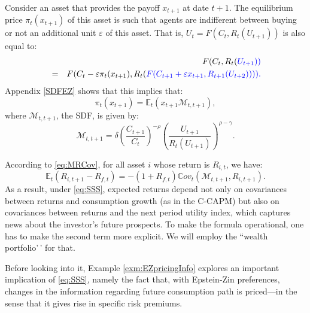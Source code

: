 \documentclass[
  12pt,
]{book}
\theoremstyle{definition}
\theoremstyle{definition}
\theoremstyle{definition}
\theoremstyle{definition}
\theoremstyle{remark}
\begin{document}
Consider an asset that provides the payoff \(x_{t+1}\) at date \(t+1\).
The equilibrium price \(\pi_t(x_{t+1})\) of this asset is such that agents are indifferent between buying or not an additional unit \(\varepsilon\) of this asset.
That is, \(U_t = F(C_t,R_t(U_{t+1}))\) is also equal to:
\begin{eqnarray}
&&  F(C_t,R_t(\color{blue}{U_{t+1}})) \nonumber \\
&=&F(C_t-\varepsilon \pi_t(x_{t+1}),R_t(\color{blue}{F(C_{t+1}+\varepsilon x_{t+1},R_{t+1}(U_{t+2}))})).\label{eq:SDFV}
\end{eqnarray}
Appendix \ref{SDFEZ} shows that this implies that:
\[
\pi_t(x_{t+1}) = \mathbb{E}_t \left( x_{t+1} \mathcal{M}_{t,t+1} \right),
\]
where \(\mathcal{M}_{t,t+1}\), the SDF, is given by:
\begin{equation}
\mathcal{M}_{t,t+1}= \delta \left(\frac{C_{t+1}}{C_t}\right)^{-\rho}  \left(\frac{U_{t+1}}{R_{t}(U_{t+1})}\right)^{\rho-\gamma}.\label{eq:SSS}
\end{equation}

According to \eqref{eq:MRCov}, for all asset \(i\) whose return is \(R_{i,t}\), we have:
\[
\mathbb{E}_t(R_{i,t+1} - R_{f,t}) = - (1 + R_{f,t}) \mathbb{C}ov_t(\mathcal{M}_{t,t+1},R_{i,t+1}).
\]
As a result, under \eqref{eq:SSS}, expected returns depend not only on covariances between returns and consumption growth (as in the C-CAPM) but also on covariances between returns and the next period utility index, which captures news about the investor's future prospects.
To make the formula operational, one has to make the second term more explicit. We will employ the ``wealth portfolio'\,' for that.

Before looking into it, Example \ref{exm:EZpricingInfo} explores an important implication of \eqref{eq:SSS}, namely the fact that, with Epstein-Zin preferences, changes in the information regarding future consumption path is priced---in the sense that it gives rise in specific risk premiums.
\end{document}
